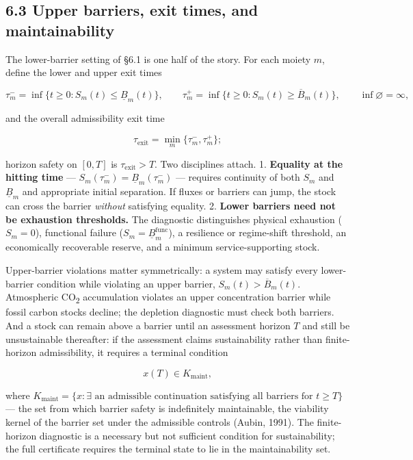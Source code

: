 \documentclass[11pt]{article}
\begin{document}
\subsection*{6.3 Upper barriers, exit times, and maintainability}\label{63-upper-barriers-exit-times-and-maintainability}

The lower-barrier setting of \S6.1 is one half of the story. For each moiety \(m\), define the lower and upper exit times 

$$\tau_m^- = \inf\{ t \ge 0 : S_m(t) \le \underline{B}_m(t) \}, \qquad \tau_m^+ = \inf\{ t \ge 0 : S_m(t) \ge \overline{B}_m(t) \}, \qquad \inf\varnothing = \infty,$$

 and the overall admissibility exit time 

$$\tau_{\mathrm{exit}} = \min_m \{ \tau_m^-, \tau_m^+ \};$$

 horizon safety on \([0,T]\) is \(\tau_{\mathrm{exit}} > T\). Two disciplines attach. 1. \textbf{Equality at the hitting time} --- \(S_m(\tau_m^-)=\allowbreak{}\underline B_m(\tau_m^-)\) --- requires continuity of both \(S_m\) and \(\underline B_m\) and appropriate initial separation. If fluxes or barriers can jump, the stock can cross the barrier \emph{without} satisfying equality. 2. \textbf{Lower barriers need not be exhaustion thresholds.} The diagnostic distinguishes physical exhaustion (\(S_m=0\)), functional failure (\(S_m=\allowbreak{}\underline B_m^{\mathrm{func}}\)), a resilience or regime-shift threshold, an economically recoverable reserve, and a minimum service-supporting stock.

Upper-barrier violations matter symmetrically: a system may satisfy every lower-barrier condition while violating an upper barrier, \(S_m(t) > \overline{B}_m(t)\). Atmospheric CO\textsubscript{2} accumulation violates an upper concentration barrier while fossil carbon stocks decline; the depletion diagnostic must check both barriers. And a stock can remain above a barrier until an assessment horizon \(T\) and still be unsustainable thereafter: if the assessment claims sustainability rather than finite-horizon admissibility, it requires a terminal condition 

$$x(T) \in K_{\mathrm{maint}},$$

 where \(K_{\mathrm{maint}} =\allowbreak{} \{ x : \exists \text{ an admissible continuation satisfying all barriers for } t \ge T \}\) --- the set from which barrier safety is indefinitely maintainable, the viability kernel of the barrier set under the admissible controls (Aubin, 1991). The finite-horizon diagnostic is a necessary but not sufficient condition for sustainability; the full certificate requires the terminal state to lie in the maintainability set.
\end{document}
